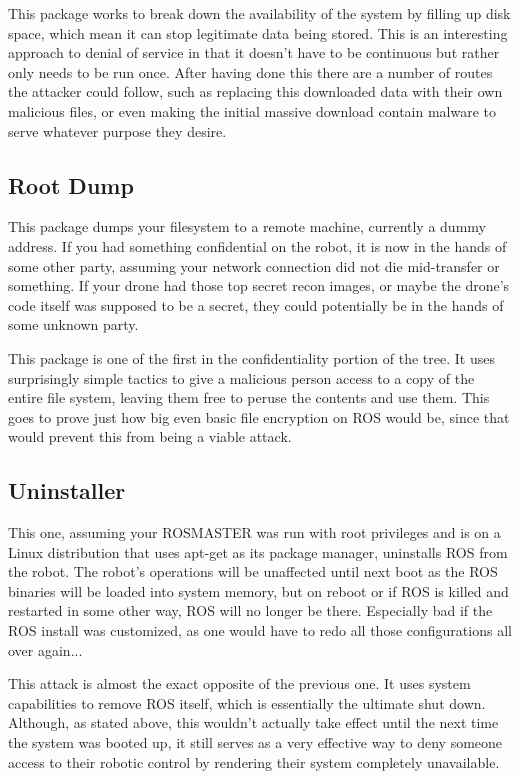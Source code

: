 \documentclass[IEEEtran,letterpaper,10pt,notitlepage,draftclsnofoot]{article}
\begin{document}
This package works to break down the availability of the system by filling up disk space, which mean it can stop legitimate data being stored.
This is an interesting approach to denial of service in that it doesn't have to be continuous but rather only needs to be run once.
After having done this there are a number of routes the attacker could follow, such as replacing this downloaded data with their own malicious files, or even making the initial massive download contain malware to serve whatever purpose they desire.

\subsection{Root Dump}
This package dumps your filesystem to a remote machine, currently a dummy address. If you had something confidential on the
robot, it is now in the hands of some other party, assuming your network connection did not die mid-transfer or something.
If your drone had those top secret recon images, or maybe the drone's code itself was supposed to be a secret, they could
potentially be in the hands of some unknown party.

This package is one of the first in the confidentiality portion of the tree.
It uses surprisingly simple tactics to give a malicious person access to a copy of the entire file system, leaving them free to peruse the contents and use them.
This goes to prove just how big even basic file encryption on ROS would be, since that would prevent this from being a viable attack.

\subsection{Uninstaller}
This one, assuming your ROSMASTER was run with root privileges and is on a Linux distribution that uses apt-get as its package
manager, uninstalls ROS from the robot. The robot's operations will be unaffected until next boot as the ROS binaries will be 
loaded into system memory, but on reboot or if ROS is killed and restarted in some other way, ROS will no longer be there.
Especially bad if the ROS install was customized, as one would have to redo all those configurations all over again...

This attack is almost the exact opposite of the previous one.
It uses system capabilities to remove ROS itself, which is essentially the ultimate shut down.
Although, as stated above, this wouldn't actually take effect until the next time the system was booted up, it still serves as a very effective way to deny someone access to their robotic control by rendering their system completely unavailable.
\end{document}

